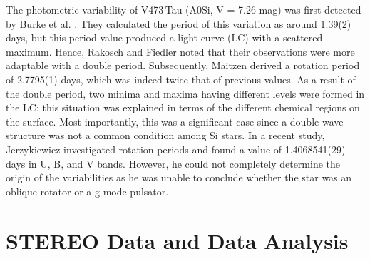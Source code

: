 \documentclass[]{article}
\begin{document}
The photometric variability of V473\,Tau (A0Si, V = 7.26 mag) was first detected by Burke et al. \cite{bib4}. They calculated the period of this variation as around 1.39(2) days, but this period value produced a light curve (LC) with a scattered maximum. Hence, Rakosch and Fiedler \cite{bib5} noted that their observations were more adaptable with a double period. Subsequently, Maitzen \cite{bib6} derived a rotation period of 2.7795(1) days, which was indeed twice that of previous values. As a result of the double period, two minima and maxima having different levels were formed in the LC; this situation was explained in terms of the different chemical regions on the surface. Most importantly, this was a significant case since a double wave structure was not a common condition among Si stars. In a recent study, Jerzykiewicz \cite{bib7} investigated rotation periods and found a value of 1.4068541(29) days in U, B, and V bands. However, he could not completely determine the origin of the variabilities as he was unable to conclude whether the star was an oblique rotator or a g-mode pulsator.



\section{STEREO Data and Data Analysis}
\end{document}
